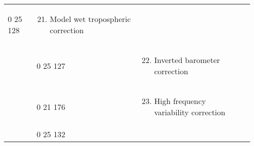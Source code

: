 \begin{longtable}[]{@{}llll@{}}
\begin{minipage}[t]{0.22\columnwidth}
0 25 128\strut
\end{minipage} & \begin{minipage}[t]{0.22\columnwidth}\raggedright
\begin{enumerate}
\setcounter{enumi}{20}
\item
  Model wet tropospheric correction
\end{enumerate}\strut
\end{minipage} & \begin{minipage}[t]{0.22\columnwidth}\raggedright
\strut
\end{minipage}\tabularnewline
\begin{minipage}[t]{0.22\columnwidth}\raggedright
\strut
\end{minipage} & \begin{minipage}[t]{0.22\columnwidth}\raggedright
0 25 127\strut
\end{minipage} & \begin{minipage}[t]{0.22\columnwidth}\raggedright
\begin{enumerate}
\setcounter{enumi}{21}
\item
  Inverted barometer correction
\end{enumerate}\strut
\end{minipage} & \begin{minipage}[t]{0.22\columnwidth}\raggedright
\strut
\end{minipage}\tabularnewline
\begin{minipage}[t]{0.22\columnwidth}\raggedright
\strut
\end{minipage} & \begin{minipage}[t]{0.22\columnwidth}\raggedright
0 21 176\strut
\end{minipage} & \begin{minipage}[t]{0.22\columnwidth}\raggedright
\begin{enumerate}
\setcounter{enumi}{22}
\item
  High frequency variability correction
\end{enumerate}\strut
\end{minipage} & \begin{minipage}[t]{0.22\columnwidth}\raggedright
\strut
\end{minipage}\tabularnewline
\begin{minipage}[t]{0.22\columnwidth}\raggedright
\strut
\end{minipage} & \begin{minipage}[t]{0.22\columnwidth}\raggedright
0 25 132\strut
\end{minipage} & \begin{minipage}[t]{0.22\columnwidth}\raggedright

\end{minipage}
\end{longtable}
